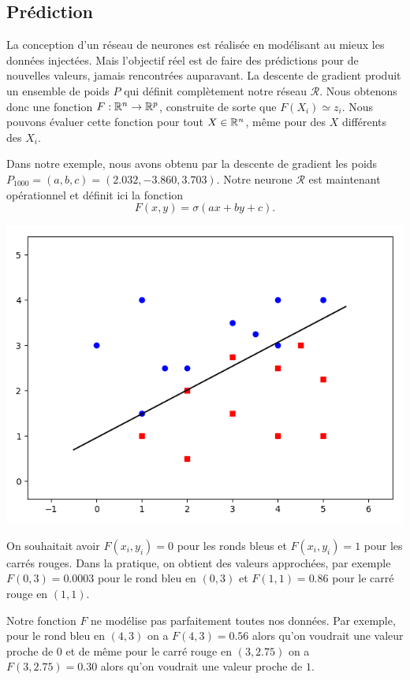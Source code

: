 {\subsection{Prédiction}

La conception d'un réseau de neurones est réalisée en modélisant au mieux les données injectées. Mais l'objectif réel est de faire des prédictions pour de nouvelles valeurs, jamais rencontrées auparavant.
La descente de gradient produit un ensemble de poids $P$ qui définit complètement notre réseau $\mathcal{R}$.
Nous obtenons donc une fonction $F : \mathbb{R}^n \to \mathbb{R}^p$, construite de sorte que $F(X_i) \simeq z_i$.
Nous pouvons évaluer cette fonction pour tout $X \in \mathbb{R}^n$, même pour des $X$ différents des $X_i$.


\begin{exemple}{}{}
	Dans notre exemple, nous avons obtenu par la descente de gradient les poids $P_{1000} = (a,b,c) = (2.032, -3.860, 3.703)$.
	Notre neurone $\mathcal{R}$ est maintenant opérationnel et définit ici la fonction 
	$$F(x,y) = \sigma(ax+by+c).$$
	
	\begin{center}
		\includegraphics[scale=\myscale,scale=0.45]{figures/retro_01_e}
	\end{center}
	
	On souhaitait avoir $F(x_i,y_i)=0$ pour les ronds bleus et $F(x_i,y_i)=1$ pour les carrés rouges.
	Dans la pratique, on obtient des valeurs approchées, par exemple $F(0,3)=0.0003$ pour le rond bleu en $(0,3)$ et $F(1,1)=0.86$ pour le carré rouge en $(1,1)$.
	
	Notre fonction $F$ ne modélise pas parfaitement toutes nos données. Par exemple, pour le rond bleu en $(4,3)$ on a $F(4,3) = 0.56$ alors qu'on voudrait une valeur proche de $0$ et de même pour le carré rouge en $(3,2.75)$ on a $F(3,2.75) = 0.30$ alors qu'on voudrait une valeur proche de $1$. 
	

\end{exemple}}
